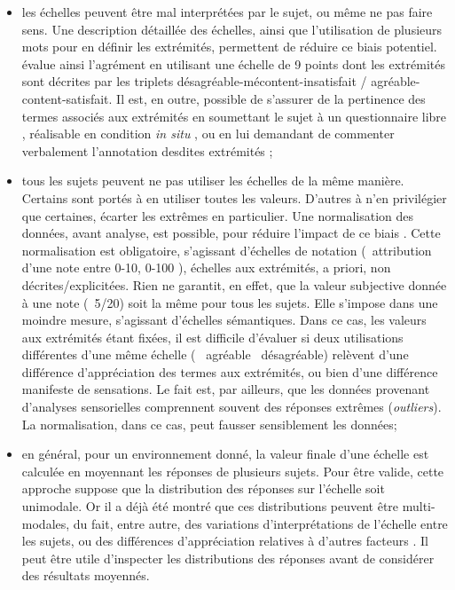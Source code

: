 \begin{itemize}
\item les échelles peuvent être mal interprétées par le sujet, ou même ne pas faire sens. Une description détaillée des échelles, ainsi que l'utilisation de plusieurs mots pour en définir les extrémités, permettent de réduire ce biais potentiel. \citep{hall2013exploratory} évalue ainsi l'agrément en utilisant une échelle de 9 points dont les extrémités sont décrites par les triplets désagréable-mécontent-insatisfait / agréable-content-satisfait. Il est, en outre, possible de s'assurer de la pertinence des termes associés aux extrémités en soumettant le sujet à un questionnaire libre \citep{guastavino2004perceptual}, réalisable en condition \emph{in situ} \citep{kang2010semantic,hong2013designing}, ou en lui demandant de commenter verbalement l'annotation desdites extrémités \citep{raimbault2006qualitative};

\item tous les sujets peuvent ne pas utiliser les échelles de la même manière. Certains sont portés à en utiliser toutes les valeurs. D'autres à n'en privilégier que certaines, écarter les extrêmes en particulier.  Une normalisation des données, avant analyse, est possible, pour réduire l'impact de ce biais \citep{defreville2004aactivity,lavandier2006contribution,nielbo2013investigating,hong2013designing}. Cette normalisation est obligatoire, s'agissant d'échelles de notation (\eg~attribution d'une note entre 0-10, 0-100 \etc), échelles aux extrémités, a priori, non décrites/explicitées. Rien ne garantit, en effet, que la valeur subjective donnée à une note (\eg~5/20) soit la même pour tous les sujets. Elle s'impose dans une moindre mesure, s'agissant d'échelles sémantiques. Dans ce cas, les valeurs aux extrémités étant fixées, il est difficile d'évaluer si deux utilisations différentes d'une même échelle (\eg~ agréable \vs~désagréable) relèvent d'une différence d'appréciation des termes aux extrémités, ou bien d'une différence manifeste de sensations. Le fait est, par ailleurs, que les données provenant d'analyses sensorielles comprennent souvent des réponses extrêmes (\emph{outliers}). La normalisation, dans ce cas, peut fausser sensiblement les données; 

\item en général, pour un environnement donné, la valeur finale d'une échelle est calculée en moyennant les réponses de plusieurs sujets. Pour être valide, cette approche suppose que la distribution des réponses sur l'échelle soit unimodale. Or il a déjà été montré que ces distributions peuvent être multi-modales, du fait, entre autre, des variations d'interprétations de l'échelle entre les sujets, ou des différences d'appréciation relatives à d'autres facteurs \citep{raimbault2006qualitative}. Il peut être utile d'inspecter les distributions des réponses avant de considérer des résultats moyennés.

\end{itemize}

